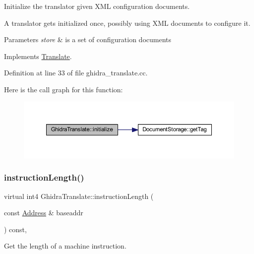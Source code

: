 Initialize the translator given X\+ML configuration documents. 

A translator gets initialized once, possibly using X\+ML documents to configure it. 
\begin{DoxyParams}{Parameters}
{\em store} & is a set of configuration documents \\
\hline
\end{DoxyParams}


Implements \mbox{\hyperlink{class_translate_af8e71e9a9477e9a91be400ecca565df5}{Translate}}.



Definition at line 33 of file ghidra\+\_\+translate.\+cc.

Here is the call graph for this function\+:
\nopagebreak
\begin{figure}[H]
\begin{center}
\leavevmode
\includegraphics[width=350pt]{class_ghidra_translate_a9a2e9180ab58ec05380f62009a7822c6_cgraph}
\end{center}
\end{figure}
\mbox{\label{class_ghidra_translate_a5935212f2ea8435a9df1b8e39020d04f}} 
\subsubsection{\texorpdfstring{instructionLength()}{instructionLength()}}
{\footnotesize\ttfamily virtual int4 Ghidra\+Translate\+::instruction\+Length (\begin{DoxyParamCaption}\item[{const \mbox{\hyperlink{class_address}{Address}} \&}]{baseaddr }\end{DoxyParamCaption}) const\hspace{0.3cm}{\ttfamily [inline]}, {\ttfamily [virtual]}}



Get the length of a machine instruction. 

